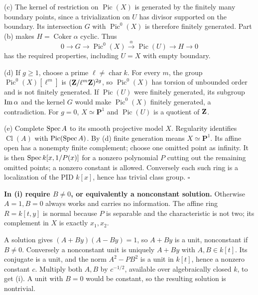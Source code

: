 \documentclass[11pt]{article}
\let\chapterexercise\exercise
\renewcommand{\exercise}[2]{\Needspace{8\baselineskip}\chapterexercise{#1}{#2}}
\begin{document}
(c) The kernel of restriction on $\operatorname{Pic}(X)$ is generated by the finitely many boundary points, since a trivialization on $U$ has divisor supported on the boundary. Its intersection $G$ with $\operatorname{Pic}^0(X)$ is therefore finitely generated. Part (b) makes $H=\operatorname{Coker}\alpha$ cyclic. Thus
\[ 0\to G\to\operatorname{Pic}^0(X)\xrightarrow{\alpha}\operatorname{Pic}(U)\to H\to0 \]
has the required properties, including $U=X$ with empty boundary.

(d) If $g\ge1$, choose a prime $\ell\ne\operatorname{char}k$. For every $m$, the group $\operatorname{Pic}^0(X)[\ell^m]$ is $(\mathbf Z/\ell^m\mathbf Z)^{2g}$, so $\operatorname{Pic}^0(X)$ has torsion of unbounded order and is not finitely generated. If $\operatorname{Pic}(U)$ were finitely generated, its subgroup $\operatorname{Im}\alpha$ and the kernel $G$ would make $\operatorname{Pic}^0(X)$ finitely generated, a contradiction. For $g=0$, $X\simeq\mathbf P^1$ and $\operatorname{Pic}(U)$ is a quotient of $\mathbf Z$.

(e) Complete $\operatorname{Spec} A$ to its smooth projective model $X$. Regularity identifies $\operatorname{Cl}(A)$ with $\operatorname{Pic}(\operatorname{Spec} A)$. By (d) finite generation means $X\simeq\mathbf P^1$. Its affine open has a nonempty finite complement; choose one omitted point as infinity. It is then $\operatorname{Spec} k[x,1/P(x)]$ for a nonzero polynomial $P$ cutting out the remaining omitted points; a nonzero constant is allowed. Conversely each such ring is a localization of the PID $k[x]$, hence has trivial class group. \hfill$\square$

\pf
\textbf{In (i) require $B\ne0$, or equivalently a nonconstant solution.} Otherwise $A=1,B=0$ always works and carries no information. The affine ring $R=k[t,y]$ is normal because $P$ is separable and the characteristic is not two; its complement in $X$ is exactly $x_1,x_2$.

A solution gives $(A+By)(A-By)=1$, so $A+By$ is a unit, nonconstant if $B\ne0$. Conversely a nonconstant unit is uniquely $A+By$ with $A,B\in k[t]$. Its conjugate is a unit, and the norm $A^2-PB^2$ is a unit in $k[t]$, hence a nonzero constant $c$. Multiply both $A,B$ by $c^{-1/2}$, available over algebraically closed $k$, to get (i). A unit with $B=0$ would be constant, so the resulting solution is nontrivial.
\end{document}

